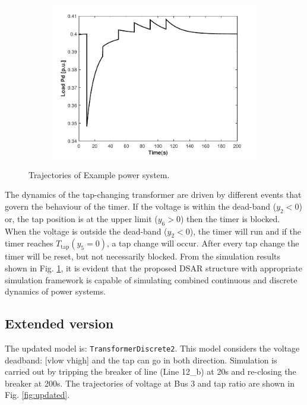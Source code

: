 \documentclass{article}	%
\begin{document}
\begin{figure}[H]
\begin{subfigure}[b]{0.5\textwidth}
    \includegraphics[width=\textwidth]{pd}
    \end{subfigure}
  \caption{Trajectories of Example power system.}
  \label{fig:tps}
\end{figure}

The dynamics of the tap-changing transformer are driven by different events that govern the behaviour of the timer. If the voltage is within the dead-band ($y_2<0$) or, the tap position is at the upper limit ($y_6>0$) then the timer is blocked. When the voltage is outside the dead-band ($y_2<0$), the timer will run and if the timer reaches $T_\text{tap} (y_5=0)$, a tap change will occur. After every tap change the timer will be reset, but not necessarily blocked. From the simulation results shown in Fig. \ref{fig:tps}, it is evident that the proposed DSAR structure with appropriate simulation framework is capable of simulating combined continuous and discrete dynamics of power systems.

\subsection{Extended version}

The updated model is: \texttt{TransformerDiscrete2}. This model considers the voltage deadband: [vlow vhigh] and the tap can go in both direction. Simulation is carried out by tripping the breaker of line (Line 12\_b) at 20s and re-closing the breaker at 200s. The trajectories of voltage at Bus 3 and tap ratio are shown in Fig. \ref{fig:updated}.
\end{document}
